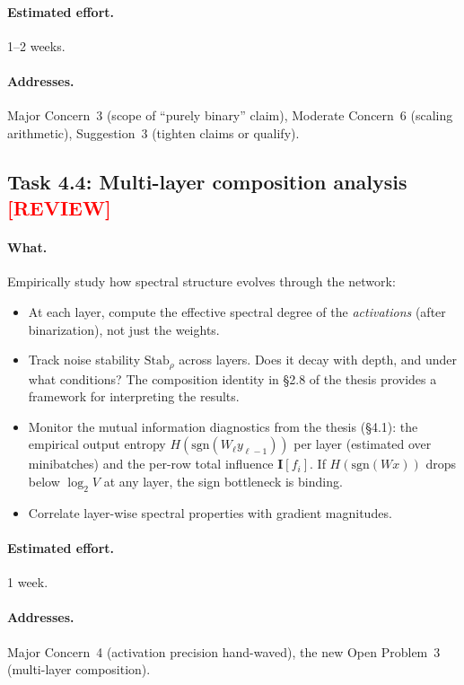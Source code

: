 \documentclass[12pt,a4paper]{article}
\newcommand{\review}{\texorpdfstring{\textcolor{red}{\textbf{[REVIEW]}}}{[REVIEW]}}
\begin{document}
\paragraph{Estimated effort.} 1--2 weeks.

\paragraph{Addresses.} Major Concern~3 (scope of ``purely binary'' claim), Moderate Concern~6 (scaling arithmetic), Suggestion~3 (tighten claims or qualify).


\subsection{Task 4.4: Multi-layer composition analysis \review}

\paragraph{What.} Empirically study how spectral structure evolves through the network:
\begin{itemize}
    \item At each layer, compute the effective spectral degree of the \emph{activations} (after binarization), not just the weights.
    \item Track noise stability $\text{Stab}_\rho$ across layers. Does it decay with depth, and under what conditions? The composition identity in \S2.8 of the thesis provides a framework for interpreting the results.
    \item Monitor the mutual information diagnostics from the thesis (\S4.1): the empirical output entropy $H(\text{sgn}(W_\ell y_{\ell-1}))$ per layer (estimated over minibatches) and the per-row total influence $\mathbf{I}[f_i]$. If $H(\text{sgn}(Wx))$ drops below $\log_2 V$ at any layer, the sign bottleneck is binding.
    \item Correlate layer-wise spectral properties with gradient magnitudes.
\end{itemize}

\paragraph{Estimated effort.} 1 week.

\paragraph{Addresses.} Major Concern~4 (activation precision hand-waved), the new Open Problem~3 (multi-layer composition).
\end{document}
